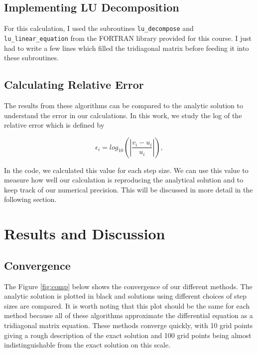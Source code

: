 \documentclass[%
oneside,                 %
final,                   %
10pt]{article}
\begin{document}
\subsection{Implementing LU Decomposition}

For this calculation, I used the subroutines \texttt{lu\_decompose} and \texttt{lu\_linear\_equation} from the FORTRAN library provided for this course.  I just had to write a few lines which filled the tridiagonal matrix before feeding it into these subroutines.

\subsection{Calculating Relative Error}

The results from these algorithms can be compared to the analytic solution to understand the error in our calculations.  In this work, we study the log of the relative error which is defined by

\[
   \epsilon_i=log_{10}\left(\left|\frac{v_i-u_i}
                 {u_i}\right|\right),
\]

In the code, we calculated this value for each step size.  We can use this value to measure how well our calculation is reproducing the analytical solution and to keep track of our numerical precision.  This will be discussed in more detail in the following section.

\section{Results and Discussion}

\subsection{Convergence}

The Figure \ref{fig:comp} below shows the convergence of our different methods.  The analytic solution is plotted in black and solutions using different choices of step sizes are compared.  It is worth noting that this plot should be the same for each method because all of these algorithms approximate the differential equation as a tridiagonal matrix equation.  These methods converge quickly, with 10 grid points giving a rough description of the exact solution and 100 grid points being almost indistinguishable from the exact solution on this scale.
\end{document}
